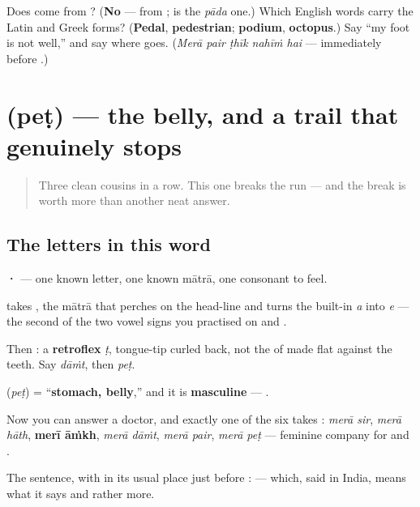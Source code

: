 \begin{tcolorbox}[breakable,colback=teal!4,colframe=teal!35!black,title={Before you move on}]
Does \textbf{} come from \textbf{}? (\textbf{No} — from \textbf{}; \textbf{} is the \emph{pāda} one.) Which English words carry the Latin and Greek forms? (\textbf{Pedal}, \textbf{pedestrian}; \textbf{podium}, \textbf{octopus}.) Say \textquotedblleft{}my foot is not well,\textquotedblright{} and say where \textbf{} goes. (\emph{Merā pair ṭhīk nahīṁ hai} — immediately before \textbf{}.)
\end{tcolorbox}
\section[\texorpdfstring{\hi{पेट} (peṭ)}{पेट (peṭ)}]{ (peṭ) — the belly, and a trail that genuinely stops}

\label{lesson:HI-C38-pet}



\begin{quote}
Three clean cousins in a row. This one breaks the run — and the break is worth more than another neat answer.
\end{quote}

\subsection*{The letters in this word}
\textbf{·} — one known letter, one known mātrā, one consonant to feel.

\textbf{} takes \textbf{}, the mātrā that perches on the head-line and turns the built-in \emph{a} into \emph{e} — the second of the two vowel signs you practised on \textbf{} and \textbf{}.

Then \textbf{}: a \textbf{retroflex} \emph{ṭ}, tongue-tip curled back, not the \textbf{} of \textbf{} made flat against the teeth. Say \emph{dāṁt}, then \emph{peṭ}.

\begin{grammarlens}[title={Grammar Lens: masculine, and the whole set together}]
\textbf{} (\emph{peṭ}) = \textquotedblleft{}\textbf{stomach, belly},\textquotedblright{} and it is \textbf{masculine} — \textbf{ }.

Now you can answer a doctor, and exactly one of the six takes \textbf{}: \emph{merā sir}, \emph{merā hāth}, \textbf{merī āṁkh}, \emph{merā dāṁt}, \emph{merā pair}, \emph{merā peṭ} — feminine company for \textbf{} and \textbf{}.

The sentence, with \textbf{} in its usual place just before \textbf{}: \textbf{    } — which, said in India, means what it says and rather more.
\end{grammarlens}

